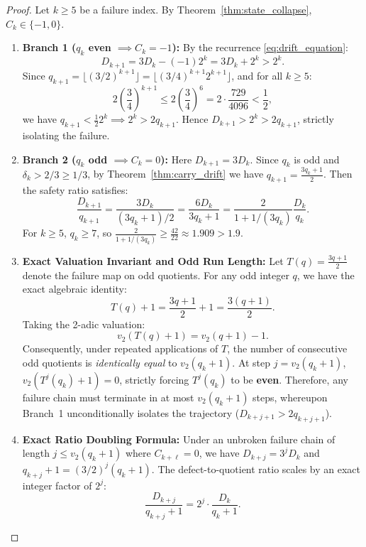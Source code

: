 \documentclass[11pt,reqno]{amsart}
\theoremstyle{definition}
\numberwithin{equation}{section}
\begin{document}
\begin{proof}
Let $k \ge 5$ be a failure index. By Theorem~\ref{thm:state_collapse}, $C_k \in \{-1, 0\}$.
\begin{enumerate}
    \item \textbf{Branch 1 ($q_k$ even $\implies C_k = -1$):}
    By the recurrence \eqref{eq:drift_equation}:
    \[
    D_{k+1} = 3 D_k - (-1) 2^k = 3 D_k + 2^k > 2^k.
    \]
    Since $q_{k+1} = \lfloor (3/2)^{k+1} \rfloor = \lfloor (3/4)^{k+1} 2^{k+1} \rfloor$, and for all $k \ge 5$:
    \[
    2 \left(\frac{3}{4}\right)^{k+1} \le 2 \left(\frac{3}{4}\right)^6 = 2 \cdot \frac{729}{4096} < \frac{1}{2},
    \]
    we have $q_{k+1} < \frac{1}{2} 2^k \implies 2^k > 2 q_{k+1}$.
    Hence $D_{k+1} > 2^k > 2 q_{k+1}$, strictly isolating the failure.
    \item \textbf{Branch 2 ($q_k$ odd $\implies C_k = 0$):}
    Here $D_{k+1} = 3 D_k$. Since $q_k$ is odd and $\delta_k > 2/3 \ge 1/3$, by Theorem~\ref{thm:carry_drift} we have $q_{k+1} = \frac{3 q_k + 1}{2}$.
    Then the safety ratio satisfies:
    \[
    \frac{D_{k+1}}{q_{k+1}} = \frac{3 D_k}{(3 q_k + 1)/2} = \frac{6 D_k}{3 q_k + 1} = \frac{2}{1 + 1/(3q_k)} \frac{D_k}{q_k}.
    \]
    For $k \ge 5$, $q_k \ge 7$, so $\frac{2}{1 + 1/(3q_k)} \ge \frac{42}{22} \approx 1.909 > 1.9$.
    \item \textbf{Exact Valuation Invariant and Odd Run Length:}
    Let $T(q) = \frac{3q+1}{2}$ denote the failure map on odd quotients. For any odd integer $q$, we have the exact algebraic identity:
    \begin{equation}\label{eq:collatz_invariant}
    T(q) + 1 = \frac{3q+1}{2} + 1 = \frac{3(q+1)}{2}.
    \end{equation}
    Taking the 2-adic valuation:
    \begin{equation}\label{eq:v2_collatz_drop}
    v_2(T(q) + 1) = v_2(q + 1) - 1.
    \end{equation}
    Consequently, under repeated applications of $T$, the number of consecutive odd quotients is \emph{identically equal} to $v_2(q_k + 1)$. At step $j = v_2(q_k + 1)$, $v_2(T^j(q_k) + 1) = 0$, strictly forcing $T^j(q_k)$ to be \textbf{even}. Therefore, any failure chain must terminate in at most $v_2(q_k + 1)$ steps, whereupon Branch~1 unconditionally isolates the trajectory ($D_{k+j+1} > 2 q_{k+j+1}$).
    \item \textbf{Exact Ratio Doubling Formula:}
    Under an unbroken failure chain of length $j \le v_2(q_k + 1)$ where $C_{k+\ell} = 0$, we have $D_{k+j} = 3^j D_k$ and $q_{k+j} + 1 = (3/2)^j (q_k + 1)$. The defect-to-quotient ratio scales by an exact integer factor of $2^j$:
    \begin{equation}\label{eq:exact_ratio_doubling}
    \frac{D_{k+j}}{q_{k+j} + 1} = 2^j \cdot \frac{D_k}{q_k + 1}.
    \end{equation}
\end{enumerate}
\end{proof}
\end{document}
